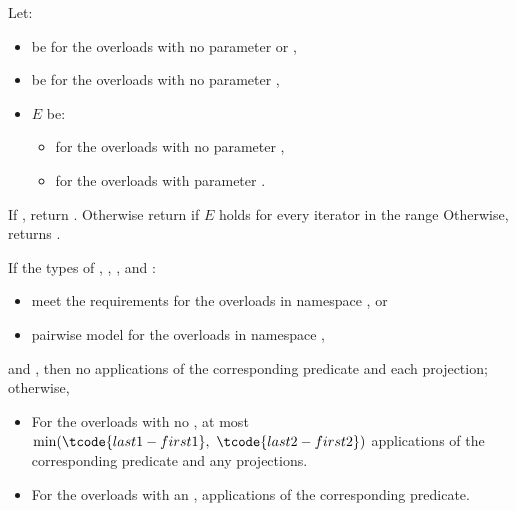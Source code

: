 \begin{itemdescr}
\pnum
Let:
\begin{itemize}
\item
   be 
  for the overloads with no parameter  or ,
\item
   be 
  for the overloads with no parameter ,
\item
  $E$ be:
  \begin{itemize}
  \setlength{\emergencystretch}{1em}
  \item
    for the overloads with no parameter ,
  \item
    for the overloads with parameter .
  \end{itemize}
\end{itemize}

\pnum
\returns
If , return .
Otherwise return 
if $E$ holds for every iterator  in the range 
Otherwise, returns .

\pnum
\complexity
If the types of , , , and :
\begin{itemize}
\item
  meet the
   requirements
  for the overloads in namespace , or
\item
  pairwise model 
  for the overloads in namespace ,
\end{itemize}
and ,
then no applications of the corresponding predicate and each projection;
otherwise,
\begin{itemize}
\item
  For the overloads with no ,
  at most $\min(\tcode{last1 - first1}, \ \tcode{last2 - first2})$
  applications of the corresponding predicate and any projections.
\item
  For the overloads with an ,
  applications of the corresponding predicate.
\end{itemize}
\end{itemdescr}

